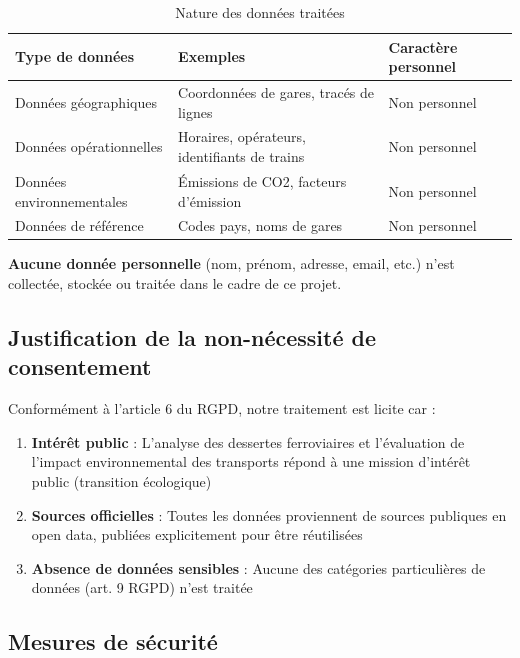 \documentclass[12pt,a4paper]{article}
\begin{document}
\begin{table}[h!]
\centering
\begin{tabular}{|p{4cm}|p{6cm}|p{4cm}|}
\hline
\textbf{Type de données} & \textbf{Exemples} & \textbf{Caractère personnel} \\
\hline
Données géographiques & Coordonnées de gares, tracés de lignes & Non personnel \\
\hline
Données opérationnelles & Horaires, opérateurs, identifiants de trains & Non personnel \\
\hline
Données environnementales & Émissions de CO2, facteurs d'émission & Non personnel \\
\hline
Données de référence & Codes pays, noms de gares & Non personnel \\
\hline
\end{tabular}
\caption{Nature des données traitées}
\end{table}

\textbf{Aucune donnée personnelle} (nom, prénom, adresse, email, etc.) n'est collectée, stockée ou traitée dans le cadre de ce projet.

\subsection{Justification de la non-nécessité de consentement}

Conformément à l'article 6 du RGPD, notre traitement est licite car :

\begin{enumerate}
    \item \textbf{Intérêt public} : L'analyse des dessertes ferroviaires et l'évaluation de l'impact environnemental des transports répond à une mission d'intérêt public (transition écologique)
    \item \textbf{Sources officielles} : Toutes les données proviennent de sources publiques en open data, publiées explicitement pour être réutilisées
    \item \textbf{Absence de données sensibles} : Aucune des catégories particulières de données (art. 9 RGPD) n'est traitée
\end{enumerate}

\subsection{Mesures de sécurité}
\end{document}
